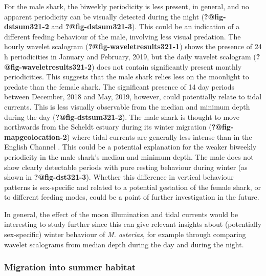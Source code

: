 \documentclass[
  authoryear,
  review,
  3p]{elsarticle}
\begin{document}
For the male shark, the biweekly periodicity is less present, in
general, and no apparent periodicity can be visually detected during the
night (\textbf{?@fig-dstsum321-2} and \textbf{?@fig-dstsum321-3}). This
could be an indication of a different feeding behaviour of the male,
involving less visual predation. The hourly wavelet scalogram
(\textbf{?@fig-waveletresults321-1}) shows the presence of 24 h
periodicities in January and February, 2019, but the daily wavelet
scalogram (\textbf{?@fig-waveletresults321-2}) does not contain
significantly present monthly periodicities. This suggests that the male
shark relies less on the moonlight to predate than the female shark. The
significant presence of 14 day periods between December, 2018 and May,
2019, however, could potentially relate to tidal currents. This is less
visually observable from the median and minimum depth during the day
(\textbf{?@fig-dstsum321-2}). The male shark is thought to move
northwards from the Scheldt estuary during its winter migration
(\textbf{?@fig-mapgeolocation-2}) where tidal currents are generally
less intense than in the English Channel
\citep{salomon_1993, arnold_1994}. This could be a potential explanation
for the weaker biweekly periodicity in the male shark's median and
minimum depth. The male does not show clearly detectable periods with
pure resting behaviour during winter (as shown in
\textbf{?@fig-dst321-3}). Whether this difference in vertical behaviour
patterns is sex-specific and related to a potential gestation of the
female shark, or to different feeding modes, could be a point of further
investigation in the future.

In general, the effect of the moon illumination and tidal currents would
be interesting to study further since this can give relevant insights
about (potentially sex-specific) winter behaviour of \emph{M. asterias},
for example through comparing wavelet scalograms from median depth
during the day and during the night.

\hypertarget{sec-disc-summermig}{%
\subsubsection{Migration into summer habitat}\label{sec-disc-summermig}}
\end{document}
